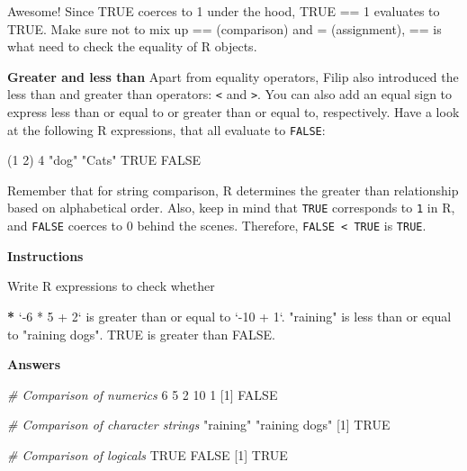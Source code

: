 \documentclass[]{article}
\newcommand{\hlnum}[1]{\textcolor[rgb]{0.816,0.125,0.439}{#1}}%
\newcommand{\hlstr}[1]{\textcolor[rgb]{0.251,0.627,0.251}{#1}}%
\newcommand{\hlcom}[1]{\textcolor[rgb]{0.502,0.502,0.502}{\textit{#1}}}%
\newcommand{\hlstd}[1]{\textcolor[rgb]{0.251,0.251,0.251}{#1}}%
\newcommand{\hlkwc}[1]{\textcolor[rgb]{0.251,0.251,0.251}{#1}}%
\newenvironment{Shaded}{\begin{myshaded}}{\end{myshaded}}
\newcommand{\DataTypeTok}[1]{\hlkwc{#1}}
\newcommand{\DecValTok}[1]{\hlnum{#1}}
\newcommand{\StringTok}[1]{\hlstr{#1}}
\newcommand{\CommentTok}[1]{\hlcom{#1}}
\newcommand{\OtherTok}[1]{{#1}}
\newcommand{\ErrorTok}[1]{\textbf{{#1}}}
\newcommand{\NormalTok}[1]{\hlstd{#1}}
\begin{document}
Awesome! Since TRUE coerces to 1 under the hood, TRUE == 1 evaluates to
TRUE. Make sure not to mix up == (comparison) and = (assignment), == is
what need to check the equality of R objects.

\textbf{Greater and less than} Apart from equality operators, Filip also
introduced the less than and greater than operators:
\texttt{\textless{}} and \texttt{\textgreater{}}. You can also add an
equal sign to express less than or equal to or greater than or equal to,
respectively. Have a look at the following R expressions, that all
evaluate to \texttt{FALSE}:

\begin{Shaded}
\begin{Highlighting}[]
\NormalTok{(}\DecValTok{1} \OperatorTok{+}\StringTok{ }\DecValTok{2}\NormalTok{) }\OperatorTok{>}\StringTok{ }\DecValTok{4}
\StringTok{"dog"} \OperatorTok{<}\StringTok{ "Cats"}
\OtherTok{TRUE} \OperatorTok{<=}\StringTok{ }\OtherTok{FALSE}
\end{Highlighting}
\end{Shaded}

Remember that for string comparison, R determines the greater than
relationship based on alphabetical order. Also, keep in mind that
\texttt{TRUE} corresponds to \texttt{1} in R, and \texttt{FALSE} coerces
to 0 behind the scenes. Therefore, \texttt{FALSE\ \textless{}\ TRUE} is
\texttt{TRUE}.

\textbf{Instructions}

\begin{Shaded}
\begin{Highlighting}[]
\NormalTok{Write R expressions to check whether}\OperatorTok{:}

\ErrorTok{*}\StringTok{ `}\DataTypeTok{-6 * 5 + 2}\StringTok{`}\NormalTok{ is greater than or equal to }\StringTok{`}\DataTypeTok{-10 + 1}\StringTok{`}\NormalTok{.}
\OperatorTok{*}\StringTok{ "raining"}\NormalTok{ is less than or equal to }\StringTok{"raining dogs"}\NormalTok{.}
\OperatorTok{*}\StringTok{ }\OtherTok{TRUE}\NormalTok{ is greater than FALSE.}
\end{Highlighting}
\end{Shaded}

\textbf{Answers}

\begin{Shaded}
\begin{Highlighting}[]
\CommentTok{# Comparison of numerics}
\OperatorTok{-}\DecValTok{6} \OperatorTok{*}\StringTok{ }\DecValTok{5} \OperatorTok{+}\DecValTok{2} \OperatorTok{>=}\StringTok{ }\OperatorTok{-}\DecValTok{10} \OperatorTok{+}\StringTok{ }\DecValTok{1}
\NormalTok{   [}\DecValTok{1}\NormalTok{] }\OtherTok{FALSE}

\CommentTok{# Comparison of character strings}
\StringTok{"raining"} \OperatorTok{<=}\StringTok{ "raining dogs"}
\NormalTok{   [}\DecValTok{1}\NormalTok{] }\OtherTok{TRUE}

\CommentTok{# Comparison of logicals}
\OtherTok{TRUE} \OperatorTok{>}\StringTok{ }\OtherTok{FALSE}
\NormalTok{   [}\DecValTok{1}\NormalTok{] }\OtherTok{TRUE}
\end{Highlighting}
\end{Shaded}
\end{document}
